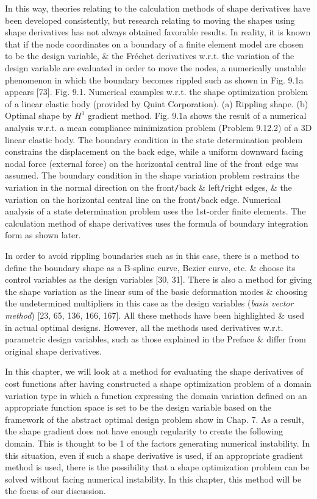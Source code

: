 \documentclass[oneside]{book}
\numberwithin{equation}{section}
\begin{document}
In this way, theories relating to the calculation methods of shape derivatives have been developed consistently, but research relating to moving the shapes using shape derivatives has not always obtained favorable results. In reality, it is known that if the node coordinates on a boundary of a finite element model are chosen to be the design variable, \& the Fr\'echet derivatives w.r.t. the variation of the design variable are evaluated in order to move the nodes, a numerically unstable phenomenon in which the boundary becomes rippled such as shown in Fig. 9.1a appears [73]. \textsf{Fig. 9.1. Numerical examples w.r.t. the shape optimization problem of a linear elastic body (provided by Quint Corporation). (a) Rippling shape. (b) Optimal shape by $H^1$ gradient method.} Fig. 9.1a shows the result of a numerical analysis w.r.t. a mean compliance minimization problem (Problem 9.12.2) of a 3D linear elastic body. The boundary condition in the state determination problem constrains the displacement on the back edge, while a uniform downward facing nodal force (external force) on the horizontal central line of the front edge was assumed. The boundary condition in the shape variation problem restrains the variation in the normal direction on the front\texttt{/}back \& left\texttt{/}right edges, \& the variation on the horizontal central line on the front\texttt{/}back edge. Numerical analysis of a state determination problem uses the 1st-order finite elements. The calculation method of shape derivatives uses the formula of boundary integration form as shown later.

In order to avoid rippling boundaries such as in this case, there is a method to define the boundary shape as a B-spline curve, Bezier curve, etc. \& choose its control variables as the design variables [30, 31]. There is also a method for giving the shape variation as the linear sum of the basic deformation modes \& choosing the undetermined multipliers in this case as the design variables (\textit{basis vector method}) [23, 65, 136, 166, 167]. All these methods have been highlighted \& used in actual optimal designs. However, all the methods used derivatives w.r.t. parametric design variables, such as those explained in the Preface \& differ from original shape derivatives.

In this chapter, we will look at a method for evaluating the shape derivatives of cost functions after having constructed a shape optimization problem of a domain variation type in which a function expressing the domain variation defined on an appropriate function space is set to be the design variable based on the framework of the abstract optimal design problem show in Chap. 7. As a result, the shape gradient does not have enough regularity to create the following domain. This is thought to be 1 of the factors generating numerical instability. In this situation, even if such a shape derivative is used, if an appropriate gradient method is used, there is the possibility that a shape optimization problem can be solved without facing numerical instability. In this chapter, this method will be the focus of our discussion.
\end{document}
